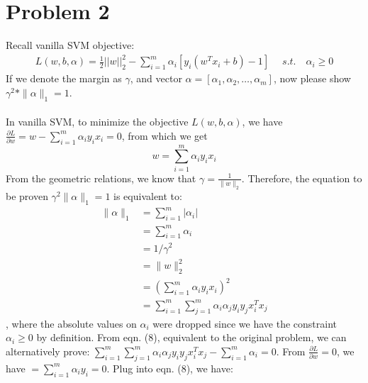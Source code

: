 \documentclass[11pt]{article}
\begin{document}
\section*{Problem 2}
Recall vanilla SVM objective:
\begin{equation}
\begin{aligned}
L(w,b,\alpha) = \frac{1}{2}||w||_2^2 - \sum\limits_{i=1}^{m}\alpha_i[y_i(w^Tx_i + b) - 1] \; \quad s.t. \quad \alpha_i \geq 0
\end{aligned}
\end{equation}
If we denote the margin as $\gamma$, and vector $\alpha=[\alpha_1, \alpha_2, \dots, \alpha_m]$, now please show $\gamma^2*\|\alpha\|_1=1$.\\ \\

In vanilla SVM, to minimize the objective $L(w,b,\alpha)$, we have $\frac{\partial{L}}{\partial{w}}=w-\sum_{i=1}^{m}\alpha_iy_ix_i=0$, from which we get
\begin{equation}
	w=\sum_{i=1}^{m}\alpha_iy_ix_i
\end{equation}
From the geometric relations, we know that $\gamma=\frac{1}{\|w\|_2}$. Therefore, the equation to be proven $\gamma^2\|\alpha\|_1=1$ is equivalent to:
\begin{equation}
	\begin{aligned}
		\|\alpha\|_1&=\sum_{i=1}^{m}|\alpha_i|\\
		&=\sum_{i=1}^{m}\alpha_i\\
		&=1/\gamma^2\\
		&=\|w\|_2^2\\
		&=(\sum_{i=1}^{m}\alpha_iy_ix_i)^2\\
		&=\sum_{i=1}^{m}\sum_{j=1}^{m}\alpha_i\alpha_jy_iy_jx^T_ix_j
	\end{aligned}
\end{equation}
, where the absolute values on $\alpha_i$ were dropped since we have the constraint $\alpha_i \geq 0$ by definition. 
From eqn. (8), equivalent to the original problem, we can alternatively prove: $\sum_{i=1}^{m}\sum_{j=1}^{m}\alpha_i\alpha_jy_iy_jx^T_ix_j-\sum_{i=1}^{m}\alpha_i=0$.
From $\frac{\partial{L}}{\partial{w}}=0$, we have $=\sum_{i=1}^{m}\alpha_iy_i=0$. Plug into eqn. (8), we have:\\
\end{document}
